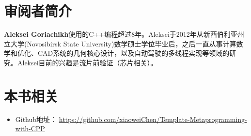 \section*{审阅者简介}

\textbf{Aleksei Goriachikh}使用的C++编程超过8年。Aleksei于2012年从新西伯利亚州立大学(Novosibirsk State University)数学硕士学位毕业后，之后一直从事计算数学和优化、CAD系统的几何核心设计，以及自动驾驶的多线程实现等领域的研究。Aleksei目前的兴趣是流片前验证（芯片相关）。

\section*{本书相关}
\begin{itemize}
  \item Github地址： \url{https://github.com/xiaoweiChen/Template-Metaprogramming-with-CPP}
\end{itemize}